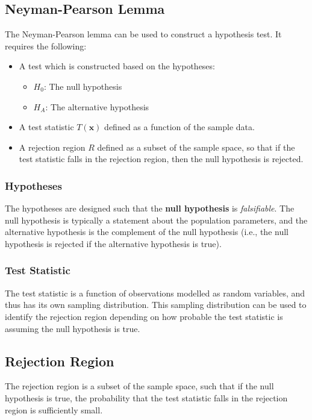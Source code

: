 \documentclass{article}
\begin{document}
\subsection{Neyman-Pearson Lemma}
The Neyman-Pearson lemma can be used to construct a hypothesis test. It
requires the following:
\begin{itemize}
    \item A test which is constructed based on the hypotheses:
          \begin{itemize}
              \item \(H_0\): The null hypothesis
              \item \(H_A\): The alternative hypothesis
          \end{itemize}
    \item A test statistic \(T\left( \symbf{x} \right)\) defined as a
          function of the sample data.
    \item A rejection region \(R\) defined as a subset of the sample
          space, so that if the test statistic falls in the rejection
          region, then the null hypothesis is rejected.
\end{itemize}
\subsubsection{Hypotheses}
The hypotheses are designed such that the \textbf{null hypothesis} is
\textit{falsifiable}. The null hypothesis is typically a statement
about the population parameters, and the alternative hypothesis is the
complement of the null hypothesis (i.e., the null hypothesis is
rejected if the alternative hypothesis is true).
\subsubsection{Test Statistic}
The test statistic is a function of observations modelled as random
variables, and thus has its own sampling distribution. This sampling
distribution can be used to identify the rejection region depending on
how probable the test statistic is assuming the null hypothesis is
true.
\subsection{Rejection Region}
The rejection region is a subset of the sample space, such that if the
null hypothesis is true, the probability that the test statistic falls
in the rejection region is sufficiently small.
\end{document}
